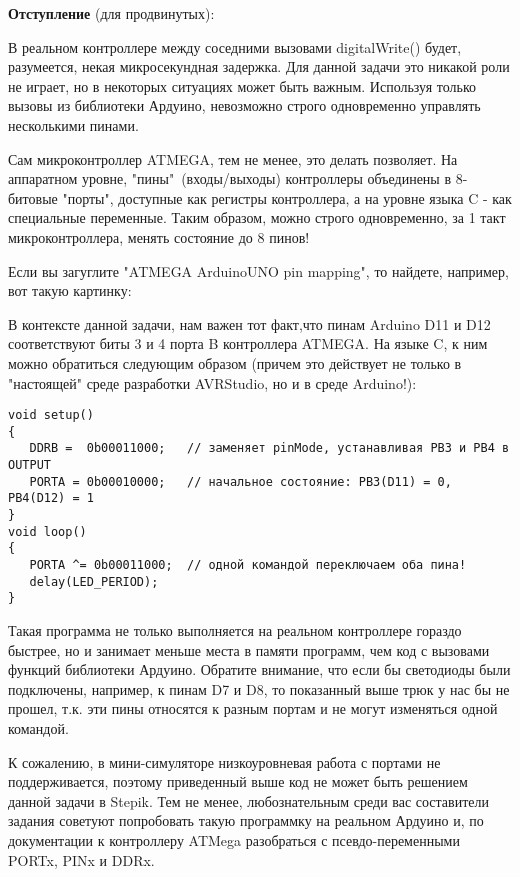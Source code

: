 \textbf{Отступление} (для продвинутых): 

В реальном контроллере между соседними вызовами digitalWrite() будет, разумеется, некая микросекундная задержка. Для данной задачи это никакой роли не играет, но в некоторых ситуациях может быть важным.  Используя только вызовы из библиотеки Ардуино, невозможно строго одновременно управлять несколькими пинами. 

Сам микроконтроллер ATMEGA, тем не менее, это делать позволяет.  На  аппаратном уровне, "пины"\ (входы/выходы) контроллеры объединены в 8-битовые "порты"{}, доступные как регистры контроллера, а на уровне языка C - как специальные переменные. Таким образом, можно строго одновременно, за 1 такт микроконтроллера, менять состояние до 8 пинов! 

Если вы загуглите "ATMEGA ArduinoUNO pin mapping", то найдете, например, вот такую картинку:


В контексте данной задачи, нам важен тот факт,что пинам Arduino D11 и D12 соответствуют биты 3 и 4 порта B контроллера ATMEGA. На языке C, к ним можно обратиться следующим образом (причем это действует не только в "настоящей" среде разработки AVRStudio, но и в среде Arduino!):

\begin{verbatim}
void setup()
{
   DDRB =  0b00011000;   // заменяет pinMode, устанавливая PB3 и PB4 в OUTPUT
   PORTA = 0b00010000;   // начальное состояние: PB3(D11) = 0, PB4(D12) = 1
}
void loop()
{
   PORTA ^= 0b00011000;  // одной командой переключаем оба пина!
   delay(LED_PERIOD); 
}
\end{verbatim}

Такая программа не только выполняется  на реальном контроллере гораздо быстрее, но и занимает меньше места в памяти программ, чем код с вызовами функций библиотеки Ардуино.  Обратите внимание, что если бы светодиоды были подключены, например, к пинам D7 и D8, то показанный выше трюк у нас бы не прошел, т.к. эти пины относятся к разным портам и не могут изменяться одной командой.

К сожалению, в мини-симуляторе низкоуровневая работа с портами не поддерживается, поэтому приведенный выше код не может быть решением данной задачи в Stepik.  Тем не менее,  любознательным среди вас составители задания советуют попробовать такую программку на реальном Ардуино и, по документации к контроллеру ATMega  разобраться с псевдо-переменными  PORTx, PINx и DDRx.
